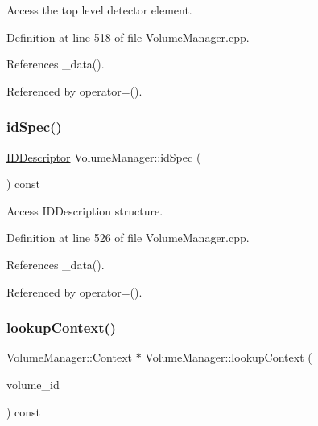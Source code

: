 Access the top level detector element. 



Definition at line 518 of file Volume\+Manager.\+cpp.



References \+\_\+data().



Referenced by operator=().

\hypertarget{class_d_d4hep_1_1_geometry_1_1_volume_manager_aa114fa9663579ed3ca0f5d59ae8d32db}{}\label{class_d_d4hep_1_1_geometry_1_1_volume_manager_aa114fa9663579ed3ca0f5d59ae8d32db} 
\subsubsection{\texorpdfstring{id\+Spec()}{idSpec()}}
{\footnotesize\ttfamily \hyperlink{class_d_d4hep_1_1_geometry_1_1_i_d_descriptor}{I\+D\+Descriptor} Volume\+Manager\+::id\+Spec (\begin{DoxyParamCaption}{ }\end{DoxyParamCaption}) const}



Access I\+D\+Description structure. 



Definition at line 526 of file Volume\+Manager.\+cpp.



References \+\_\+data().



Referenced by operator=().

\hypertarget{class_d_d4hep_1_1_geometry_1_1_volume_manager_ac6e159608642efd4a62d81f793a01263}{}\label{class_d_d4hep_1_1_geometry_1_1_volume_manager_ac6e159608642efd4a62d81f793a01263} 
\subsubsection{\texorpdfstring{lookup\+Context()}{lookupContext()}}
{\footnotesize\ttfamily \hyperlink{class_d_d4hep_1_1_geometry_1_1_volume_manager_adadb14f2ccbeaad001b7bc6ddb6dc715}{Volume\+Manager\+::\+Context} $\ast$ Volume\+Manager\+::lookup\+Context (\begin{DoxyParamCaption}\item[{\hyperlink{class_d_d4hep_1_1_geometry_1_1_volume_manager_ab1f746b561c93be38bc7c6e66fc8ca8a}{Volume\+ID}}]{volume\+\_\+id }\end{DoxyParamCaption}) const}



